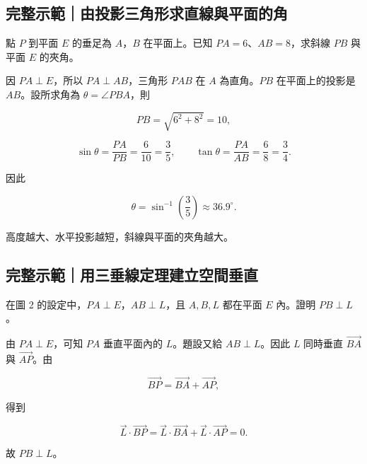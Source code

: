 \documentclass[11pt,a4paper]{article}
\begin{document}
\begin{HandoutWorkedExample}

\subsection{完整示範｜由投影三角形求直線與平面的角}\label{ux5b8cux6574ux793aux7bc4ux7531ux6295ux5f71ux4e09ux89d2ux5f62ux6c42ux76f4ux7ddaux8207ux5e73ux9762ux7684ux89d2}

點 \(P\) 到平面 \(E\) 的垂足為 \(A\)，\(B\) 在平面上。已知 \(PA=6\)、\(AB=8\)，求斜線 \(PB\) 與平面 \(E\) 的夾角。

因 \(PA\perp E\)，所以 \(PA\perp AB\)，三角形 \(PAB\) 在 \(A\) 為直角。\(PB\) 在平面上的投影是 \(AB\)。設所求角為 \(\theta=\angle PBA\)，則

\[
PB=\sqrt{6^2+8^2}=10,
\]

\[
\sin\theta=\frac{PA}{PB}=\frac{6}{10}=\frac35,
\qquad
\tan\theta=\frac{PA}{AB}=\frac{6}{8}=\frac34.
\]

因此

\[
\boxed{\theta=\sin^{-1}\!\left(\frac35\right)\approx36.9^\circ}.
\]

高度越大、水平投影越短，斜線與平面的夾角越大。

\end{HandoutWorkedExample}

\begin{HandoutWorkedExample}

\subsection{完整示範｜用三垂線定理建立空間垂直}\label{ux5b8cux6574ux793aux7bc4ux7528ux4e09ux5782ux7ddaux5b9aux7406ux5efaux7acbux7a7aux9593ux5782ux76f4}

在圖 2 的設定中，\(PA\perp E\)，\(AB\perp L\)，且 \(A,B,L\) 都在平面 \(E\) 內。證明 \(PB\perp L\)。

由 \(PA\perp E\)，可知 \(PA\) 垂直平面內的 \(L\)。題設又給 \(AB\perp L\)。因此 \(L\) 同時垂直 \(\overrightarrow{BA}\) 與 \(\overrightarrow{AP}\)。由

\[
\overrightarrow{BP}=\overrightarrow{BA}+\overrightarrow{AP},
\]

得到

\[
\vec L\cdot\overrightarrow{BP}
=\vec L\cdot\overrightarrow{BA}+\vec L\cdot\overrightarrow{AP}=0.
\]

故 \(PB\perp L\)。

\end{HandoutWorkedExample}
\end{document}
